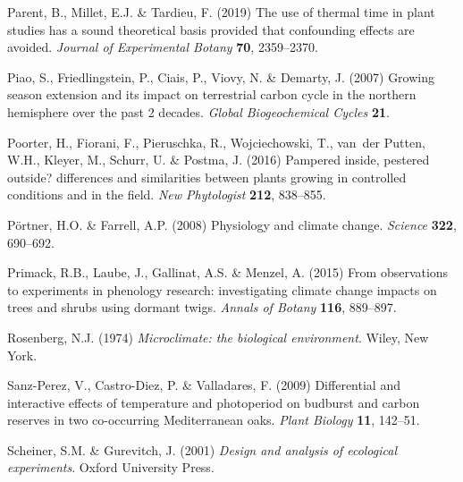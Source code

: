 \documentclass[11pt]{article}
\begin{document}
\begin{thebibliography}{49}
Parent, B., Millet, E.J. \& Tardieu, F. (2019) The use of thermal time in plant
  studies has a sound theoretical basis provided that confounding effects are
  avoided. \emph{Journal of Experimental Botany} \textbf{70}, 2359--2370.

Piao, S., Friedlingstein, P., Ciais, P., Viovy, N. \& Demarty, J. (2007)
  Growing season extension and its impact on terrestrial carbon cycle in the
  northern hemisphere over the past 2 decades. \emph{Global Biogeochemical
  Cycles} \textbf{21}.

Poorter, H., Fiorani, F., Pieruschka, R., Wojciechowski, T., van~der Putten,
  W.H., Kleyer, M., Schurr, U. \& Postma, J. (2016) Pampered inside, pestered
  outside? differences and similarities between plants growing in controlled
  conditions and in the field. \emph{New Phytologist} \textbf{212}, 838--855.

P{\"o}rtner, H.O. \& Farrell, A.P. (2008) Physiology and climate change.
  \emph{Science} \textbf{322}, 690--692.

Primack, R.B., Laube, J., Gallinat, A.S. \& Menzel, A. ({2015}) {From
  observations to experiments in phenology research: investigating climate
  change impacts on trees and shrubs using dormant twigs}. \emph{{Annals of
  Botany}} \textbf{{116}}, {889--897}.

Rosenberg, N.J. (1974) \emph{Microclimate: the biological environment}. Wiley,
  New York.

Sanz-Perez, V., Castro-Diez, P. \& Valladares, F. (2009) Differential and
  interactive effects of temperature and photoperiod on budburst and carbon
  reserves in two co-occurring {M}editerranean oaks. \emph{Plant Biology}
  \textbf{11}, 142--51.

Scheiner, S.M. \& Gurevitch, J. (2001) \emph{Design and analysis of ecological
  experiments}. Oxford University Press.


\end{thebibliography}
\end{document}
